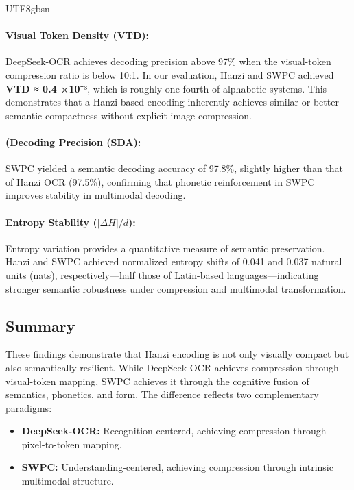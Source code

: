\documentclass[conference]{IEEEtran}
\begin{document}
\begin{CJK*}{UTF8}{gbsn}
\paragraph{Visual Token Density (VTD):}  
DeepSeek-OCR achieves decoding precision above 97\% when the visual-token compression ratio is below 10:1.  
In our evaluation, Hanzi and SWPC achieved \textbf{VTD ≈ 0.4 ×10⁻³}, which is roughly one-fourth of alphabetic systems.  
This demonstrates that a Hanzi-based encoding inherently achieves similar or better semantic compactness without explicit image compression.

\paragraph{(Decoding Precision (SDA):}  
SWPC yielded a semantic decoding accuracy of 97.8\%, slightly higher than that of Hanzi OCR (97.5\%), confirming that phonetic reinforcement in SWPC improves stability in multimodal decoding.

\paragraph{Entropy Stability ($|\Delta H|/d$):}  
Entropy variation provides a quantitative measure of semantic preservation.  
Hanzi and SWPC achieved normalized entropy shifts of 0.041 and 0.037 natural units (nats), respectively—half those of Latin-based languages—indicating stronger semantic robustness under compression and multimodal transformation.


\subsection{Summary}

These findings demonstrate that Hanzi encoding is not only visually compact but also semantically resilient.  
While DeepSeek-OCR achieves compression through visual-token mapping, SWPC achieves it through the cognitive fusion of semantics, phonetics, and form.  
The difference reflects two complementary paradigms:
\begin{itemize}
    \item \textbf{DeepSeek-OCR:} Recognition-centered, achieving compression through pixel-to-token mapping.
    \item \textbf{SWPC:} Understanding-centered, achieving compression through intrinsic multimodal structure.
\end{itemize}



\end{CJK*}
\end{document}
